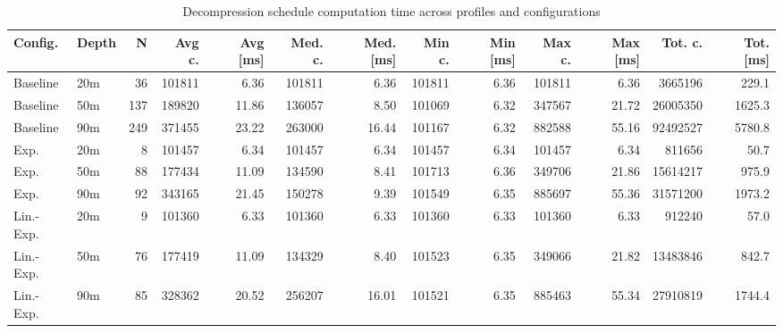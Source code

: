\begin{landscape}
\begin{table}[p]
\centering
\small
\renewcommand{\arraystretch}{1.15}
\begin{tabular}{llrrrrrrrrrrr}
\toprule
Config. & Depth & N & Avg c. & Avg [\si{\milli\second}] & Med. c. & Med. [\si{\milli\second}] & Min c. & Min [\si{\milli\second}] & Max c. & Max [\si{\milli\second}] & Tot. c. & Tot. [\si{\milli\second}] \\
\midrule
Baseline & 20m & 36 & 101811 & 6.36 & 101811 & 6.36 & 101811 & 6.36 & 101811 & 6.36 & 3665196 & 229.1 \\
Baseline & 50m & 137 & 189820 & 11.86 & 136057 & 8.50 & 101069 & 6.32 & 347567 & 21.72 & 26005350 & 1625.3 \\
Baseline & 90m & 249 & 371455 & 23.22 & 263000 & 16.44 & 101167 & 6.32 & 882588 & 55.16 & 92492527 & 5780.8 \\
Exp. & 20m & 8 & 101457 & 6.34 & 101457 & 6.34 & 101457 & 6.34 & 101457 & 6.34 & 811656 & 50.7 \\
Exp. & 50m & 88 & 177434 & 11.09 & 134590 & 8.41 & 101713 & 6.36 & 349706 & 21.86 & 15614217 & 975.9 \\
Exp. & 90m & 92 & 343165 & 21.45 & 150278 & 9.39 & 101549 & 6.35 & 885697 & 55.36 & 31571200 & 1973.2 \\
Lin.-Exp. & 20m & 9 & 101360 & 6.33 & 101360 & 6.33 & 101360 & 6.33 & 101360 & 6.33 & 912240 & 57.0 \\
Lin.-Exp. & 50m & 76 & 177419 & 11.09 & 134329 & 8.40 & 101523 & 6.35 & 349066 & 21.82 & 13483846 & 842.7 \\
Lin.-Exp. & 90m & 85 & 328362 & 20.52 & 256207 & 16.01 & 101521 & 6.35 & 885463 & 55.34 & 27910819 & 1744.4 \\
\bottomrule
\end{tabular}
\caption{Decompression schedule computation time across profiles and configurations}
\label{tab:timing_deco_schedule}
\end{table}
\end{landscape}
